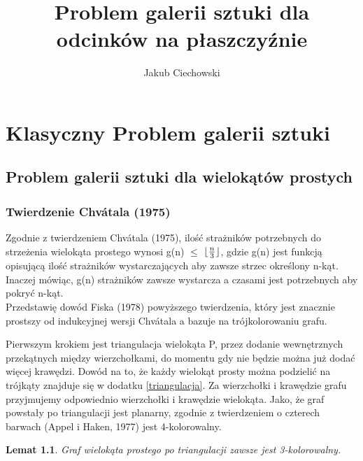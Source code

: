 \documentclass[brudnopis]{xmgr}
\author   {Jakub Ciechowski}
\title    {Problem galerii sztuki dla odcinków na płaszczyźnie}
\date     {\ymdtoday}
\DeclarePairedDelimiter\floor{\lfloor}{\rfloor}
\newtheorem{Lemat}{Lemat}
\begin{document}
%

%

\chapter{Klasyczny Problem galerii sztuki}

\section{Problem galerii sztuki dla wielokątów prostych}


\subsection{Twierdzenie Chv\'atala (1975)}
Zgodnie z twierdzeniem Chv\'atala (1975)\label{tw chvatala}, ilość strażników potrzebnych do strzeżenia wielokąta prostego wynosi g(n) $\le$ $\floor{\frac{n}{3}}$, gdzie g(n) jest funkcją opisującą ilość strażników wystarczających aby zawsze strzec określony n-kąt. Inaczej mówiąc, g(n) strażników zawsze wystarcza a czasami jest potrzebnych aby pokryć n-kąt.
\\Przedstawię dowód Fiska (1978) powyższego twierdzenia, który jest znacznie prostszy od indukcyjnej wersji Chv\'atala a bazuje na trójkolorowaniu grafu. 

Pierwszym krokiem jest triangulacja wielokąta P, przez dodanie wewnętrznych przekątnych między wierzchołkami, do momentu gdy nie będzie można już dodać więcej krawędzi. 
Dowód na to, że każdy wielokąt prosty można podzielić na trójkąty znajduje się w dodatku \ref{triangulacja}.
Za wierzchołki i krawędzie grafu przyjmujemy odpowiednio wierzchołki i krawędzie wielokąta. Jako, że graf powstały po triangulacji jest planarny, zgodnie z twierdzeniem o czterech barwach (Appel i Haken, 1977) jest 4-kolorowalny.
\begin{Lemat}
Graf wielokąta prostego po triangulacji zawsze jest 3-kolorowalny.
\end{Lemat}
\end{document}
